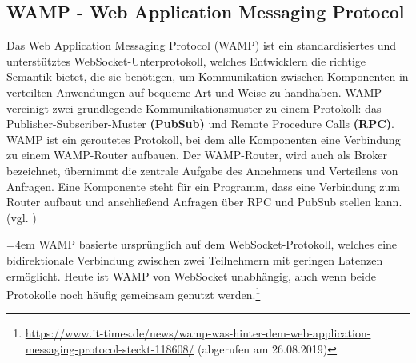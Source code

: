 \subsection{WAMP - Web Application Messaging Protocol}
\label{sec:wamp}
Das Web Application Messaging Protocol (WAMP) ist ein standardisiertes und unterstütztes WebSocket-Unterpro\-tokoll, welches Entwicklern die richtige Semantik bietet, die sie benötigen, um Kommunikation zwischen Komponenten in verteilten Anwendungen auf bequeme Art und Weise zu handhaben. WAMP vereinigt zwei grundlegende Kommunikationsmuster zu einem Protokoll: das Publisher-Subscriber-Muster \textbf{(PubSub)} und Remote Procedure Calls \textbf{(RPC)}. WAMP ist ein geroutetes Protokoll, bei dem alle Komponenten eine Verbindung zu einem WAMP-Router aufbauen. Der WAMP-Router, wird auch als Broker bezeichnet, übernimmt die zentrale Aufgabe des Annehmens und Verteilens von Anfragen. Eine Komponente steht für ein Programm, dass eine Verbindung zum Router aufbaut und anschließend Anfragen über RPC und PubSub stellen kann.(vgl. \cite{wamp})\bigskip

\par
\begingroup
\leftskip=4em %
\rightskip\leftskip
\noindent \glqq WAMP basierte ursprünglich auf dem WebSocket-Protokoll, welches eine bidirektionale Verbindung zwischen zwei Teilnehmern mit geringen Latenzen ermöglicht. Heute ist WAMP von WebSocket unabhängig, auch wenn beide Protokolle noch häufig gemeinsam genutzt werden.\grqq{}\footnote{\url{https://www.it-times.de/news/wamp-was-hinter-dem-web-application-messaging-protocol-steckt-118608/} (abgerufen am 26.08.2019)}
\par
\endgroup

